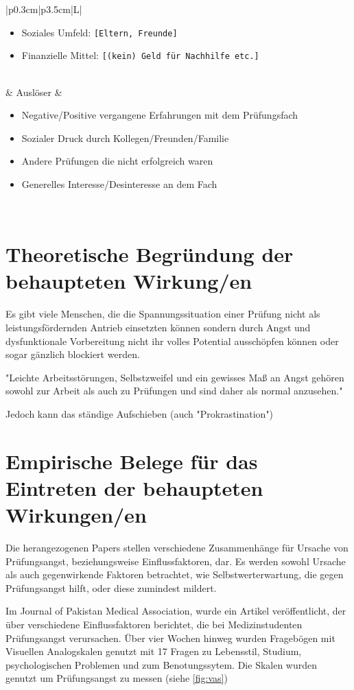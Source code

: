 \documentclass[11pt, a4paper]{article}
\begin{document}
\begin{table}[h!]
\begin{tabularx}{\textwidth}{|p{0.3cm}|p{3.5cm}|L|}
\begin{itemize}[noitemsep, topsep=0pt]
			\item Soziales Umfeld: \texttt{[Eltern, Freunde]}
			\item Finanzielle Mittel: \texttt{[(kein) Geld für Nachhilfe etc.]}
		\end{itemize} \\
		 & Auslöser                               & 
		\begin{itemize}[noitemsep, topsep=0pt]
			\item Negative/Positive vergangene Erfahrungen mit dem Prüfungsfach
			\item Sozialer Druck durch Kollegen/Freunden/Familie
			\item Andere Prüfungen die nicht erfolgreich waren
			\item Generelles Interesse/Desinteresse an dem Fach
		\end{itemize} \\
		\hline
	\end{tabularx}
\end{table}
\newpage
\section*{Theoretische Begründung der behaupteten Wirkung/en}
Es gibt viele Menschen, die die Spannungssituation einer Prüfung nicht als leistungsfördernden Antrieb einsetzten können sondern durch Angst und dysfunktionale Vorbereitung nicht ihr volles Potential ausschöpfen können oder sogar gänzlich blockiert werden. \cite{Holm-Hadulla2009}

"Leichte Arbeitsstörungen, Selbstzweifel und ein gewisses Maß an Angst gehören sowohl zur Arbeit als auch zu Prüfungen und sind daher als normal anzusehen." \cite{Holm-Hadulla2009}

Jedoch kann das ständige Aufschieben (auch "Prokrastination")

\newpage
\section*{Empirische Belege für das Eintreten der behaupteten Wirkungen/en}

	Die herangezogenen Papers stellen verschiedene Zusammenhänge für Ursache von\\ Prüfungsangst, beziehungsweise Einflussfaktoren, dar. Es werden sowohl Ursache als auch gegenwirkende Faktoren betrachtet, wie Selbstwerterwartung, die gegen Prüfungsangst hilft, oder diese zumindest mildert.

	Im Journal of Pakistan Medical Association, wurde ein Artikel veröffentlicht, der über verschiedene Einflussfaktoren berichtet, die bei Medizinstudenten Prüfungsangst verursachen. Über vier Wochen hinweg wurden Fragebögen mit Visuellen Analogskalen genutzt mit 17 Fragen zu Lebensstil, Studium, psychologischen Problemen und zum Benotungssytem. Die Skalen wurden genutzt um Prüfungsangst zu messen (siehe \cref{fig:vas}) \cite{hashmat2008factors}
\end{document}
